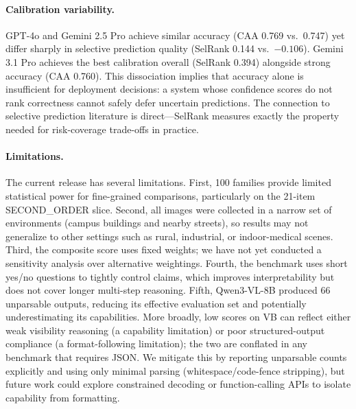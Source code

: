 \documentclass[11pt]{article}
\newcommand{\benchmarkname}{\textsc{VB}}
\begin{document}
\paragraph{Calibration variability.} GPT-4o and Gemini 2.5 Pro achieve similar accuracy (CAA 0.769 vs.\ 0.747) yet differ sharply in selective prediction quality (SelRank 0.144 vs.\ $-0.106$). Gemini 3.1 Pro achieves the best calibration overall (SelRank 0.394) alongside strong accuracy (CAA 0.760). This dissociation implies that accuracy alone is insufficient for deployment decisions: a system whose confidence scores do not rank correctness cannot safely defer uncertain predictions. The connection to selective prediction literature \citep{elyaniv_selective_2010,geifman_selectivenet_2019} is direct---SelRank measures exactly the property needed for risk-coverage trade-offs in practice.

\paragraph{Limitations.}
The current release has several limitations. First, 100 families provide limited statistical power for fine-grained comparisons, particularly on the 21-item SECOND\_ORDER slice. Second, all images were collected in a narrow set of environments (campus buildings and nearby streets), so results may not generalize to other settings such as rural, industrial, or indoor-medical scenes. Third, the composite score uses fixed weights; we have not yet conducted a sensitivity analysis over alternative weightings. Fourth, the benchmark uses short yes/no questions to tightly control claims, which improves interpretability but does not cover longer multi-step reasoning. Fifth, Qwen3-VL-8B produced 66 unparsable outputs, reducing its effective evaluation set and potentially underestimating its capabilities. More broadly, low scores on \benchmarkname{} can reflect either weak visibility reasoning (a capability limitation) or poor structured-output compliance (a format-following limitation); the two are conflated in any benchmark that requires JSON. We mitigate this by reporting unparsable counts explicitly and using only minimal parsing (whitespace/code-fence stripping), but future work could explore constrained decoding or function-calling APIs to isolate capability from formatting.
\end{document}
